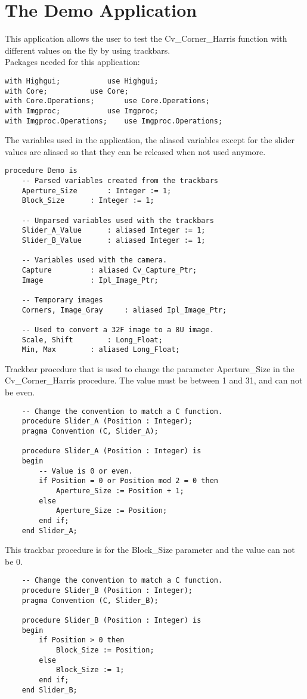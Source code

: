 \section{The Demo Application}
This application allows the user to test the Cv_Corner_Harris function with different values on the fly by using trackbars.
\\
Packages needed for this application:
\begin{lstlisting}
with Highgui; 			use Highgui;
with Core; 			use Core;
with Core.Operations; 		use Core.Operations;
with Imgproc; 			use Imgproc;
with Imgproc.Operations; 	use Imgproc.Operations;
\end{lstlisting}
The variables used in the application, the aliased variables except for the slider values are aliased so that they can be released when not used anymore.
\begin{lstlisting}
procedure Demo is
	-- Parsed variables created from the trackbars
	Aperture_Size		: Integer := 1;
	Block_Size 		: Integer := 1;

	-- Unparsed variables used with the trackbars
	Slider_A_Value 		: aliased Integer := 1;
	Slider_B_Value 		: aliased Integer := 1;   

	-- Variables used with the camera.
	Capture 		: aliased Cv_Capture_Ptr;
	Image 			: Ipl_Image_Ptr;

	-- Temporary images
	Corners, Image_Gray 	: aliased Ipl_Image_Ptr;
   	
	-- Used to convert a 32F image to a 8U image.
	Scale, Shift		: Long_Float;
	Min, Max 		: aliased Long_Float;
\end{lstlisting}
Trackbar procedure that is used to change the parameter Aperture_Size in the Cv_Corner_Harris procedure. The value must be between 1 and 31, and can not be even.
\begin{lstlisting}
	-- Change the convention to match a C function.
	procedure Slider_A (Position : Integer);
	pragma Convention (C, Slider_A);   

	procedure Slider_A (Position : Integer) is
	begin
		-- Value is 0 or even.
		if Position = 0 or Position mod 2 = 0 then 
			Aperture_Size := Position + 1;
		else
			Aperture_Size := Position;
		end if;
	end Slider_A;
\end{lstlisting}
This trackbar procedure is for the Block_Size parameter and the value can not be 0.
\begin{lstlisting}
	-- Change the convention to match a C function.
	procedure Slider_B (Position : Integer);
	pragma Convention (C, Slider_B);

	procedure Slider_B (Position : Integer) is
	begin
		if Position > 0 then
			Block_Size := Position;
		else
			Block_Size := 1;
		end if;
	end Slider_B;
\end{lstlisting}
